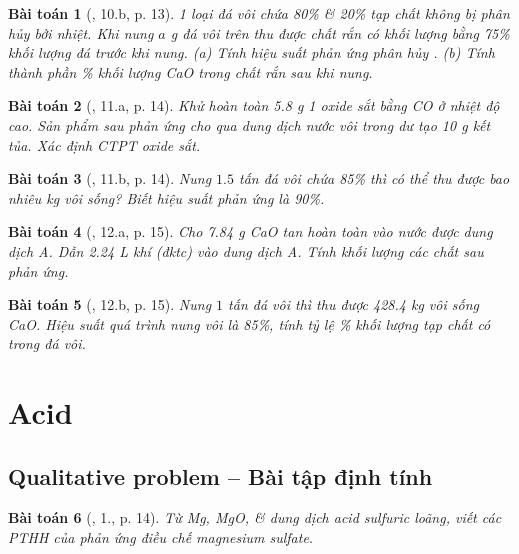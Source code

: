 \documentclass{article}
\newtheorem{baitoan}{Bài toán}
\begin{document}
\begin{baitoan}[\cite{An_350_BT_Hoa_Hoc_9}, 10.b, p. 13]
	1 loại đá vôi chứa \emph{80\% } \& \emph{20\%} tạp chất không bị phân hủy bởi nhiệt. Khi nung $a$ \emph{g} đá vôi trên thu được chất rắn có khối lượng bằng \emph{75\%} khối lượng đá trước khi nung. (a) Tính hiệu suất phản ứng phân hủy \emph{}. (b) Tính thành phần \% khối lượng \emph{CaO} trong chất rắn sau khi nung.
\end{baitoan}

\begin{baitoan}[\cite{An_350_BT_Hoa_Hoc_9}, 11.a, p. 14]
	Khử hoàn toàn \emph{5.8 g} 1 oxide sắt bằng \emph{CO} ở nhiệt độ cao. Sản phẩm sau phản ứng cho qua dung dịch nước vôi trong dư tạo \emph{10 g} kết tủa. Xác định CTPT oxide sắt.
\end{baitoan}

\begin{baitoan}[\cite{An_350_BT_Hoa_Hoc_9}, 11.b, p. 14]
	Nung $1.5$ tấn đá vôi chứa \emph{85\% } thì có thể thu được bao nhiêu \emph{kg} vôi sống? Biết hiệu suất phản ứng là \emph{90\%}.
\end{baitoan}

\begin{baitoan}[\cite{An_350_BT_Hoa_Hoc_9}, 12.a, p. 15]
	Cho \emph{7.84 g CaO} tan hoàn toàn vào nước được dung dịch A. Dẫn \emph{2.24 L} khí \emph{} (đktc) vào dung dịch A. Tính khối lượng các chất sau phản ứng.
\end{baitoan}

\begin{baitoan}[\cite{An_350_BT_Hoa_Hoc_9}, 12.b, p. 15]
	Nung $1$ tấn đá vôi thì thu được \emph{428.4 kg} vôi sống \emph{CaO}. Hiệu suất quá trình nung vôi là \emph{85\%}, tính tỷ lệ \emph{\%} khối lượng tạp chất có trong đá vôi.
\end{baitoan}


\section{Acid}

\subsection{Qualitative problem -- Bài tập định tính}

\begin{baitoan}[\cite{SGK_Hoa_Hoc_9}, 1., p. 14]
	Từ \emph{Mg, MgO, } \& dung dịch acid sulfuric loãng, viết các PTHH của phản ứng điều chế magnesium sulfate.
\end{baitoan}
\end{document}
